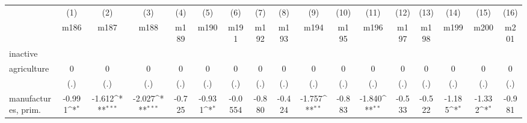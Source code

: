 {
\def\sym#1{\ifmmode^{#1}\else\(^{#1}\)\fi}
\begin{tabular}{l*{16}{c}}
\hline\hline
                    &\multicolumn{1}{c}{(1)}&\multicolumn{1}{c}{(2)}&\multicolumn{1}{c}{(3)}&\multicolumn{1}{c}{(4)}&\multicolumn{1}{c}{(5)}&\multicolumn{1}{c}{(6)}&\multicolumn{1}{c}{(7)}&\multicolumn{1}{c}{(8)}&\multicolumn{1}{c}{(9)}&\multicolumn{1}{c}{(10)}&\multicolumn{1}{c}{(11)}&\multicolumn{1}{c}{(12)}&\multicolumn{1}{c}{(13)}&\multicolumn{1}{c}{(14)}&\multicolumn{1}{c}{(15)}&\multicolumn{1}{c}{(16)}\\
                    &\multicolumn{1}{c}{m186}&\multicolumn{1}{c}{m187}&\multicolumn{1}{c}{m188}&\multicolumn{1}{c}{m189}&\multicolumn{1}{c}{m190}&\multicolumn{1}{c}{m191}&\multicolumn{1}{c}{m192}&\multicolumn{1}{c}{m193}&\multicolumn{1}{c}{m194}&\multicolumn{1}{c}{m195}&\multicolumn{1}{c}{m196}&\multicolumn{1}{c}{m197}&\multicolumn{1}{c}{m198}&\multicolumn{1}{c}{m199}&\multicolumn{1}{c}{m200}&\multicolumn{1}{c}{m201}\\
\hline
inactive            &                     &                     &                     &                     &                     &                     &                     &                     &                     &                     &                     &                     &                     &                     &                     &                     \\
agriculture         &           0         &           0         &           0         &           0         &           0         &           0         &           0         &           0         &           0         &           0         &           0         &           0         &           0         &           0         &           0         &           0         \\
                    &         (.)         &         (.)         &         (.)         &         (.)         &         (.)         &         (.)         &         (.)         &         (.)         &         (.)         &         (.)         &         (.)         &         (.)         &         (.)         &         (.)         &         (.)         &         (.)         \\
[1em]
manufactures, prim. &      -0.991\sym{*}  &      -1.612\sym{***}&      -2.027\sym{***}&      -0.725         &      -0.931\sym{*}  &     -0.0554         &      -0.880         &      -0.424         &      -1.757\sym{**} &      -0.883         &      -1.840\sym{**} &      -0.533         &      -0.522         &      -1.185\sym{*}  &      -1.332\sym{*}  &      -0.981         \\

\end{tabular}}
